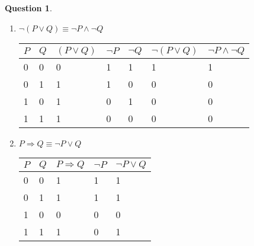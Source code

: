 \documentclass[11pt,a4paper]{article}
\theoremstyle{definition}%
\newtheorem{Q}{Question}[] %
\begin{document}
\begin{Q}
{\begin{enumerate}
    \item $\neg(P \vee Q) \equiv \neg P \wedge \neg Q$

\begin{tabular}{|l|l|l|l|l|l|l|}
\hline
$P$ & $Q$ & $(P \vee Q)$ & $\neg P$ & $\neg Q$ & $\neg (P \vee Q)$ & $\neg P \wedge \neg Q$ \\ \hline
0   & 0   & 0            & 1        & 1        & 1                 & 1                      \\ \hline
0   & 1   & 1            & 1        & 0        & 0                 & 0                      \\ \hline
1   & 0   & 1            & 0        & 1        & 0                 & 0                      \\ \hline
1   & 1   & 1            & 0        & 0        & 0                 & 0                      \\ \hline
\end{tabular}

    \item $P \Rightarrow Q \equiv \neg P \vee Q $

\begin{tabular}{|l|l|l|l|l|}
\hline
$P$ & $Q$ & $P \Rightarrow Q$ & $\neg P$ & $\neg P \vee Q$ \\ \hline
0   & 0   & 1                 & 1        & 1               \\ \hline
0   & 1   & 1                 & 1        & 1               \\ \hline
1   & 0   & 0                 & 0        & 0               \\ \hline
1   & 1   & 1                 & 0        & 1               \\ \hline
\end{tabular}

\end{enumerate}

}

\end{Q}
\end{document}
